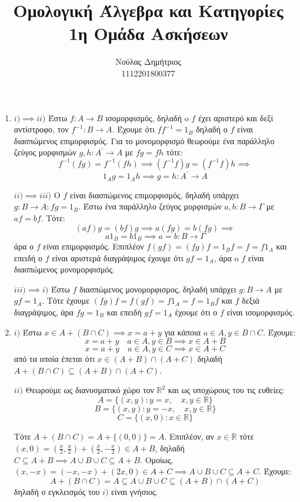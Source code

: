 \documentclass{article}
\title{\textbf{Ομολογική Άλγεβρα και Κατηγορίες} \\ 1η Ομάδα Ασκήσεων}
\author{Νούλας Δημήτριος \\ 1112201800377}
\begin{document}
\maketitle

\begin{enumerate}

	\item $i)\implies ii)$ Έστω $f : A \rightarrow B$ ισομορφισμός, δηλαδή o $f$ έχει αριστερό και δεξί αντίστροφο, τον $f^{-1} : B \rightarrow A$. Έχουμε ότι $f f^{-1} = 1_B$ δηλαδή ο $f$ είναι διασπώμενος επιμορφισμός. Για το μονομορφισμό θεωρούμε ένα παράλληλο ζεύγος μορφισμών $g,h : A^{\prime} \rightarrow A$ με $fg = fh $ τότε:
		$$f^{-1} (fg) = f^{-1}(fh) \implies (f^{-1}f)g = (f^{-1}f)h \implies$$
		$$1_A g = 1_A h \implies g = h : A^{\prime} \rightarrow A$$

		$ii) \implies iii)$ Ο $f$ είναι διασπώμενος επιμορφισμός, δηλαδή υπάρχει $g: B \rightarrow A : fg=1_B$. Έστω ένα παράλληλο ζεύγος μορφισμών $a,b : B \rightarrow \Gamma$ με $af = bf$. Τότε:
		$$(af)g = (bf)g \implies a(fg) = b(fg)\implies$$
		$$a 1_B = b 1_B \implies a = b : B \rightarrow \Gamma$$
		άρα ο $f$ είναι επιμορφισμός. Επιπλέον $f(gf) = (fg)f = 1_B f = f = f 1_A$ και επειδή ο $f$ είναι αριστερά διαγράψιμος έχουμε ότι $gf= 1_A$, άρα o $f$ είναι διασπώμενος μονομορφισμός. 
		$ $\newline

		$iii) \implies i)$ Έστω $f$ διασπώμενος μονομορφισμος, δηλαδή υπάρχει $g: B \rightarrow A$ με $ gf = 1_A$. Τότε έχουμε $(fg)f = f(gf) = f 1_A = f = 1_B f$ και $f$ δεξιά διαγράψιμος, άρα $fg=1_B$ και επειδή $gf=1_A$ έχουμε ότι ο $f$ είναι ισομορφισμός.
		$ $\newline
	
	\item $i)$ Έστω $x \in A + (B\cap C) \implies x = a + y$ για κάποια $a \in A, y \in B\cap C$. Έχουμε:
		$$x=a+y \quad a\in A, y \in B \implies x \in A+B$$
		$$x = a+y \quad a\in A,y\in C \implies x \in A+C$$
		από τα οποία έπεται ότι $x \in (A+B)\cap (A+C)$ δηλαδή $A + (B\cap C) \subseteq (A+B)\cap (A+C)$.

		$ii)$ Θεωρούμε ως διανυσματικό χώρο τον $\mathbb{R}^2$ και ως υποχώρους του τις ευθείες:
		$$A = \{ (x,y): y=x , \quad x,y\in \mathbb{R} \}$$
		$$B = \{ (x,y): y=-x, \quad x,y \in \mathbb{R} \}$$
		$$C = \{ (x,0) : x\in \mathbb{R} \}$$

		Τότε $A+(B\cap C) = A + \{ (0,0) \} = A$. Επιπλέον, αν $x \in \mathbb{R}$ τότε $(x,0) = (\frac{x}{2}, \frac{x}{2}) +  (\frac{x}{2}, -\frac{x}{2}) \in A + B$, δηλαδή $C \subseteq A+B \implies A\cup B \cup C \subseteq A + B$. Ομοίως, $(x,-x) = (-x,-x) + (2x,0) \in A + C \implies A\cup B \cup C \subseteq A + C$.
		Έχουμε:
		$$A + (B\cap C) = A \subseteq A \cup B \cup C \subseteq (A+B)\cap (A+C)$$
		δηλαδή ο εγκλεισμός του $i)$ είναι γνήσιος.
		$ $\newline


\end{enumerate}
\end{document}

